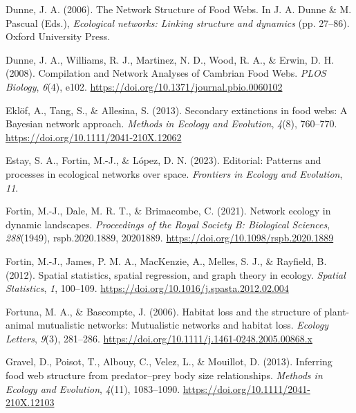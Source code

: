 \documentclass[
]{article}
\newlength{\cslhangindent}
\newenvironment{CSLReferences}[2] %
 {\begin{list}{}{%
  \setlength{\itemindent}{0pt}
  \setlength{\leftmargin}{0pt}
  \setlength{\parsep}{0pt}
  \ifodd #1
   \setlength{\leftmargin}{\cslhangindent}
   \setlength{\itemindent}{-1\cslhangindent}
  \fi
  \setlength{\itemsep}{#2\baselineskip}}}
 {\end{list}}
\begin{document}
\begin{CSLReferences}{1}{0}
Dunne, J. A. (2006). The {Network Structure} of {Food Webs}. In J. A.
Dunne \& M. Pascual (Eds.), \emph{Ecological networks: {Linking}
structure and dynamics} (pp. 27--86). Oxford University Press.

Dunne, J. A., Williams, R. J., Martinez, N. D., Wood, R. A., \& Erwin,
D. H. (2008). Compilation and {Network Analyses} of {Cambrian Food
Webs}. \emph{PLOS Biology}, \emph{6}(4), e102.
\url{https://doi.org/10.1371/journal.pbio.0060102}

Eklöf, A., Tang, S., \& Allesina, S. (2013). Secondary extinctions in
food webs: A {Bayesian} network approach. \emph{Methods in Ecology and
Evolution}, \emph{4}(8), 760--770.
\url{https://doi.org/10.1111/2041-210X.12062}

Estay, S. A., Fortin, M.-J., \& López, D. N. (2023). Editorial:
{Patterns} and processes in ecological networks over space.
\emph{Frontiers in Ecology and Evolution}, \emph{11}.

Fortin, M.-J., Dale, M. R. T., \& Brimacombe, C. (2021). Network ecology
in dynamic landscapes. \emph{Proceedings of the Royal Society B:
Biological Sciences}, \emph{288}(1949), rspb.2020.1889, 20201889.
\url{https://doi.org/10.1098/rspb.2020.1889}

Fortin, M.-J., James, P. M. A., MacKenzie, A., Melles, S. J., \&
Rayfield, B. (2012). Spatial statistics, spatial regression, and graph
theory in ecology. \emph{Spatial Statistics}, \emph{1}, 100--109.
\url{https://doi.org/10.1016/j.spasta.2012.02.004}

Fortuna, M. A., \& Bascompte, J. (2006). Habitat loss and the structure
of plant-animal mutualistic networks: {Mutualistic} networks and habitat
loss. \emph{Ecology Letters}, \emph{9}(3), 281--286.
\url{https://doi.org/10.1111/j.1461-0248.2005.00868.x}

Gravel, D., Poisot, T., Albouy, C., Velez, L., \& Mouillot, D. (2013).
Inferring food web structure from predator--prey body size
relationships. \emph{Methods in Ecology and Evolution}, \emph{4}(11),
1083--1090. \url{https://doi.org/10.1111/2041-210X.12103}


\end{CSLReferences}
\end{document}
